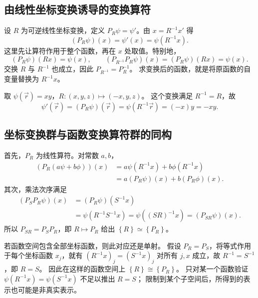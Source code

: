 \subsection{由线性坐标变换诱导的变换算符}
设 $R$ 为可逆线性坐标变换，定义 $P_R\psi=\psi'$。由 $x=R^{-1}x'$ 得
\begin{equation}
\left(P_R\psi\right)\left(x\right)=\psi'\left(x\right)=\psi\left(R^{-1}x\right).
\end{equation}
这里先让算符作用于整个函数，再在 $x$ 处取值。特别地，
\begin{equation}
\left(P_R\psi\right)\left(Rx\right)=\psi\left(x\right),\qquad
\left(P_{R^{-1}}P_R\psi\right)\left(x\right)=\left(P_R\psi\right)\left(Rx\right)=\psi\left(x\right).
\end{equation}
交换 $R$ 与 $R^{-1}$ 也成立，因此 $P_{R^{-1}}=P_R^{-1}$。
求变换后的函数，就是将原函数的自变量替换为 $R^{-1}x$。

\begin{example}[反射对标量函数的作用]
取 $\psi\left(\vec r\right)=xy$，$R:\left(x,y,z\right)\mapsto\left(-x,y,z\right)$。
这个变换满足 $R^{-1}=R$，故
\begin{equation}
\psi'\left(\vec r\right)=\left(P_R\psi\right)\left(\vec r\right)=\psi\left(R^{-1}\vec r\right)=\left(-x\right)y=-xy.
\end{equation}
\end{example}

\subsection{坐标变换群与函数变换算符群的同构}
首先，$P_R$ 为线性算符。对常数 $a,b$，
\begin{align}
\left(P_R\left(a\psi+b\phi\right)\right)\left(x\right)
&=a\psi\left(R^{-1}x\right)+b\phi\left(R^{-1}x\right)\\
&=a\left(P_R\psi\right)\left(x\right)+b\left(P_R\phi\right)\left(x\right).
\end{align}
其次，乘法次序满足
\begin{align}
\left(P_SP_R\psi\right)\left(x\right)&=\left(P_R\psi\right)\left(S^{-1}x\right)\\
&=\psi\left(R^{-1}S^{-1}x\right)=\psi\left(\left(SR\right)^{-1}x\right)=\left(P_{SR}\psi\right)\left(x\right).
\end{align}
所以 $P_{SR}=P_SP_R$，即 $R\mapsto P_R$ 给出 $\left\{R\right\}\simeq\left\{P_R\right\}$。

若函数空间包含全部坐标函数，则此对应还是单射。
假设 $P_R=P_S$，将等式作用于每个坐标函数 $x_j$，就有
$\left(R^{-1}x\right)_j=\left(S^{-1}x\right)_j$ 对所有 $j,x$ 成立，故 $R^{-1}=S^{-1}$，即 $R=S$。
因此在这样的函数空间上 $\left\{R\right\}\cong\left\{P_R\right\}$。
只对某一个函数验证 $\psi\left(R^{-1}x\right)=\psi\left(S^{-1}x\right)$ 不足以推出 $R=S$；
限制到某个子空间后，所得到的表示也可能是非真实表示。


